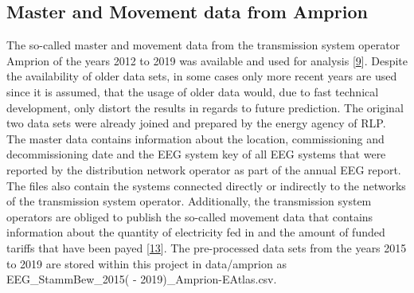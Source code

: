 \documentclass[a4paper,11pt]{article}
\begin{document}
\hypertarget{master-and-movement-data-from-amprion}{%
\subsection{Master and Movement data from Amprion}\label{master-and-movement-data-from-amprion}}

The so-called master and movement data from the transmission system operator Amprion of the years 2012 to 2019 was available and used for analysis {[}\protect\hyperlink{ref-EnergieagenturRheinlandPfalz.2021}{9}{]}. Despite the availability of older data sets, in some cases only more recent years are used since it is assumed, that the usage of older data would, due to fast technical development, only distort the results in regards to future prediction. The original two data sets were already joined and prepared by the energy agency of RLP. The master data contains information about the location, commissioning and decommissioning date and the EEG system key of all EEG systems that were reported by the distribution network operator as part of the annual EEG report. The files also contain the systems connected directly or indirectly to the networks of the transmission system operator. Additionally, the transmission system operators are obliged to publish the so-called movement data that contains information about the quantity of electricity fed in and the amount of funded tariffs that have been payed {[}\protect\hyperlink{ref-AmprionGmbH.2019}{13}{]}. The pre-processed data sets from the years 2015 to 2019 are stored within this project in data/amprion as EEG\_StammBew\_2015( - 2019)\_Amprion-EAtlas.csv.
\end{document}
